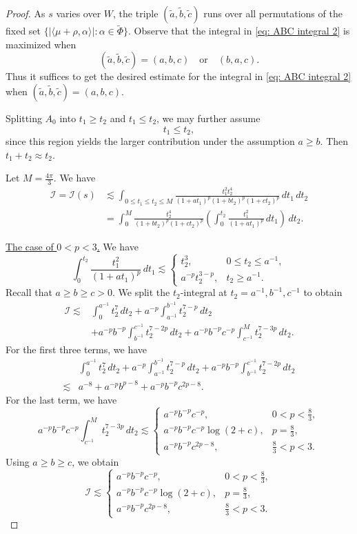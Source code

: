 \documentclass[10pt,a4paper]{amsart}
\begin{document}
\begin{proof}
As $s$ varies over $W$, the triple $(\widetilde{a},\widetilde{b},\widetilde{c})$ runs over all permutations of the fixed set
$\{ |\langle \mu+\rho, \alpha \rangle| : \alpha \in \widetilde{\Phi} \}$. Observe that the integral in \eqref{eq: ABC integral 2} is maximized when
\[
(\widetilde a,\widetilde b,\widetilde c)=(a,b,c)
\quad\text{or}\quad
(b,a,c).
\]
Thus it suffices to get the desired estimate for the integral in \eqref{eq: ABC integral 2} when $(\widetilde a,\widetilde b,\widetilde c)=(a,b,c)$. 

Splitting \(A_0\) into \(t_1\ge t_2\) and \(t_1\le t_2\), we may further assume 
\[t_1\le t_2,\]
since this region yields the larger contribution under the assumption $a\geq b$. Then $t_1+t_2\approx t_2$. 

Let $M=\frac{4\pi}{3}$. We have 
\begin{align*}
    \mathcal{I}=\mathcal{I}(s)&\lesssim \int_{0\leq t_1\leq t_2\leq M} 
    \frac{t_1^2t_2^4}{(1+at_1)^p(1+bt_2)^p(1+ct_2)^p}
    \,dt_1\,dt_2\\
    &=\int_0^M \frac{t_2^4}{(1+bt_2)^p(1+ct_2)^p}
\left(\int_0^{t_2}\frac{t_1^2}{(1+at_1)^p}\,dt_1\right)\,dt_2.
\end{align*}

\underline{The case of \(0<p<3\).} We have
\[
\int_0^{t_2}\frac{t_1^2}{(1+at_1)^p}\,dt_1
\lesssim
\begin{cases}
t_2^3, & 0\le t_2\le a^{-1},\\[1mm]
a^{-p}t_2^{3-p}, & t_2\ge a^{-1}.
\end{cases}
\]
Recall that $a \ge b \ge c > 0$. We split the $t_2$-integral at 
$t_2 = a^{-1}, b^{-1}, c^{-1}$ to obtain 
\begin{align*}
\mathcal I
\lesssim&
\int_0^{a^{-1}} t_2^7\,dt_2
+a^{-p}\int_{a^{-1}}^{b^{-1}} t_2^{7-p}\,dt_2\\
& +a^{-p}b^{-p}\int_{b^{-1}}^{c^{-1}} t_2^{7-2p}\,dt_2
+a^{-p}b^{-p}c^{-p}\int_{c^{-1}}^M t_2^{7-3p}\,dt_2.
\end{align*}
For the first three terms, we have 
\begin{align*}
    & \int_0^{a^{-1}} t_2^7\,dt_2
+a^{-p}\int_{a^{-1}}^{b^{-1}} t_2^{7-p}\,dt_2
+a^{-p}b^{-p}\int_{b^{-1}}^{c^{-1}} t_2^{7-2p}\,dt_2\\
\lesssim & a^{-8}+a^{-p}b^{p-8}+a^{-p}b^{-p}c^{2p-8}.
\end{align*}
For the last term, we have 
$$a^{-p}b^{-p}c^{-p}\int_{c^{-1}}^M t_2^{7-3p}\,dt_2\lesssim \begin{cases}
a^{-p}b^{-p}c^{-p}, & 0<p<\frac83,\\[1mm]
a^{-p}b^{-p}c^{-p}\log(2+c), & p=\frac83,\\[1mm]
a^{-p}b^{-p}c^{2p-8}, & \frac83<p<3.
\end{cases}$$
Using $a\geq b\geq c$,  we obtain
\[
\mathcal I\lesssim
\begin{cases}
a^{-p}b^{-p}c^{-p}, & 0<p<\frac83,\\[1mm]
a^{-p}b^{-p}c^{-p}\log(2+c), & p=\frac83,\\[1mm]
a^{-p}b^{-p}c^{2p-8}, & \frac83<p<3.
\end{cases}
\]


\end{proof}
\end{document}
